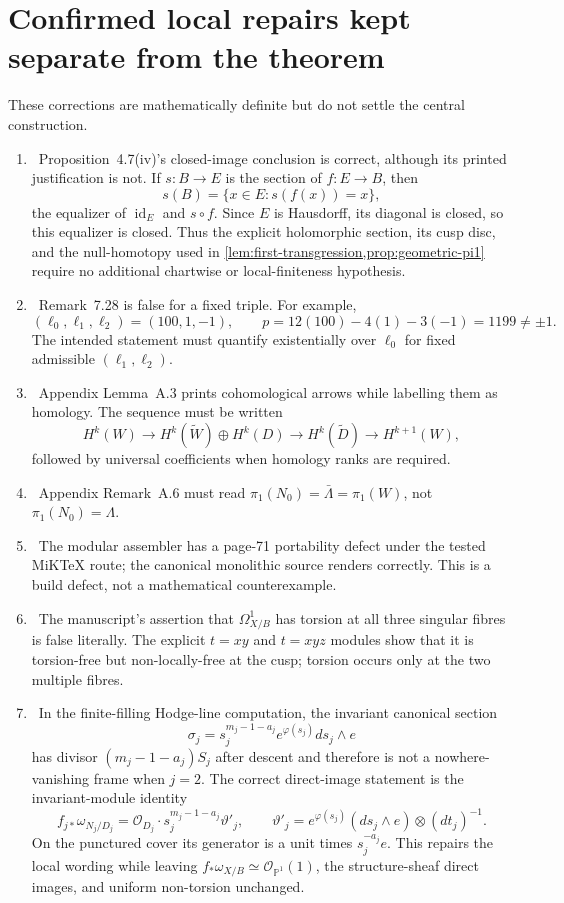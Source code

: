 \section{Confirmed local repairs kept separate from the theorem}

These corrections are mathematically definite but do not settle the central construction.

\begin{enumerate}[leftmargin=2em]
\item \Verified\ Proposition~4.7(iv)'s closed-image conclusion is correct,
although its printed justification is not.  If \(s:B\to E\) is the section
of \(f:E\to B\), then
\[
 s(B)=\{x\in E:s(f(x))=x\},
\]
the equalizer of \(\operatorname{id}_E\) and \(s\circ f\).  Since \(E\) is
Hausdorff, its diagonal is closed, so this equalizer is closed.  Thus the
explicit holomorphic section, its cusp disc, and the null-homotopy used in
\cref{lem:first-transgression,prop:geometric-pi1} require no additional
chartwise or local-finiteness hypothesis.
\item \Refuted\ Remark~7.28 is false for a fixed triple. For example,
\[
(\ell_0,\ell_1,\ell_2)=(100,1,-1),\qquad
p=12(100)-4(1)-3(-1)=1199\ne\pm1.
\]
The intended statement must quantify existentially over $\ell_0$ for fixed admissible $(\ell_1,\ell_2)$.
\item \Verified\ Appendix Lemma~A.3 prints cohomological arrows while labelling them as homology. The sequence must be written
\[
H^k(W)\longrightarrow H^k(\widetilde W)\oplus H^k(D)
\longrightarrow H^k(\widetilde D)\longrightarrow H^{k+1}(W),
\]
followed by universal coefficients when homology ranks are required.
\item \Verified\ Appendix Remark~A.6 must read $\pi_1(N_0)=\bar\Lambda=\pi_1(W)$, not $\pi_1(N_0)=\Lambda$.
\item \Verified\ The modular assembler has a page-71 portability defect under the tested MiK\TeX{} route; the canonical monolithic source renders correctly. This is a build defect, not a mathematical counterexample.
\item \Refuted\ The manuscript's assertion that $\Omega^1_{X/B}$ has
torsion at all three singular fibres is false literally.  The explicit
$t=xy$ and $t=xyz$ modules show that it is torsion-free but non-locally-free
at the cusp; torsion occurs only at the two multiple fibres.
\item \Verified\ In the finite-filling Hodge-line computation, the invariant
canonical section
\[
 \sigma_j=s_j^{m_j-1-a_j}e^{\varphi(s_j)}ds_j\wedge e
\]
has divisor \((m_j-1-a_j)S_j\) after descent and therefore is not a
nowhere-vanishing frame when \(j=2\).  The correct direct-image statement is
the invariant-module identity
\[
 f_{j*}\omega_{N_j/D_j}
 =\mathcal O_{D_j}\cdot s_j^{m_j-1-a_j}\vartheta'_j,
 \qquad
 \vartheta'_j=e^{\varphi(s_j)}(ds_j\wedge e)\otimes(dt_j)^{-1}.
\]
On the punctured cover its generator is a unit times \(s_j^{-a_j}e\).
This repairs the local wording while leaving
\(f_*\omega_{X/B}\simeq\mathcal O_{\mathbb P^1}(1)\), the structure-sheaf
direct images, and uniform non-torsion unchanged.
\end{enumerate}
